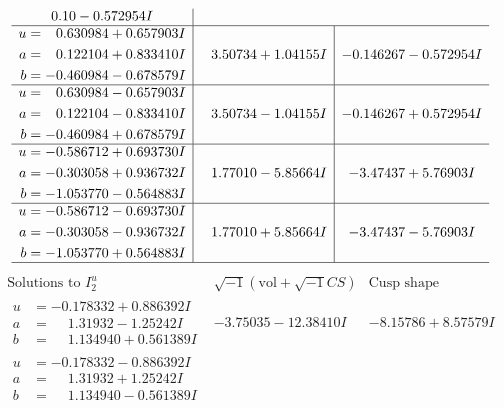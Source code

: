 \documentclass[1p]{elsarticle_modified}
\theoremstyle{definition}
\newcommand{\I}{\sqrt{-1}}
\begin{document}
$$\begin{array}{c|c|c}
0. 10   - 0.572954 I \\ \hline\begin{aligned}
u &= \phantom{-}0.630984 + 0.657903 I \\
a &= \phantom{-}0.122104 + 0.833410 I \\
b &= -0.460984 - 0.678579 I\end{aligned}
 & \phantom{-}3.50734 + 1.04155 I & -0.146267 - 0.572954 I \\ \hline\begin{aligned}
u &= \phantom{-}0.630984 - 0.657903 I \\
a &= \phantom{-}0.122104 - 0.833410 I \\
b &= -0.460984 + 0.678579 I\end{aligned}
 & \phantom{-}3.50734 - 1.04155 I & -0.146267 + 0.572954 I \\ \hline\begin{aligned}
u &= -0.586712 + 0.693730 I \\
a &= -0.303058 + 0.936732 I \\
b &= -1.053770 - 0.564883 I\end{aligned}
 & \phantom{-}1.77010 - 5.85664 I & -3.47437 + 5.76903 I \\ \hline\begin{aligned}
u &= -0.586712 - 0.693730 I \\
a &= -0.303058 - 0.936732 I \\
b &= -1.053770 + 0.564883 I\end{aligned}
 & \phantom{-}1.77010 + 5.85664 I & -3.47437 - 5.76903 I\\
 \hline 
 \end{array}$$\newpage$$\begin{array}{c|c|c}  
\text{Solutions to }I^u_{2}& \I (\text{vol} + \sqrt{-1}CS) & \text{Cusp shape}\\
 \hline 
\begin{aligned}
u &= -0.178332 + 0.886392 I \\
a &= \phantom{-}1.31932 - 1.25242 I \\
b &= \phantom{-}1.134940 + 0.561389 I\end{aligned}
 & -3.75035 - 12.38410 I & -8.15786 + 8.57579 I \\ \hline\begin{aligned}
u &= -0.178332 - 0.886392 I \\
a &= \phantom{-}1.31932 + 1.25242 I \\
b &= \phantom{-}1.134940 - 0.561389 I\end{aligned}

\end{array}$$
\end{document}
